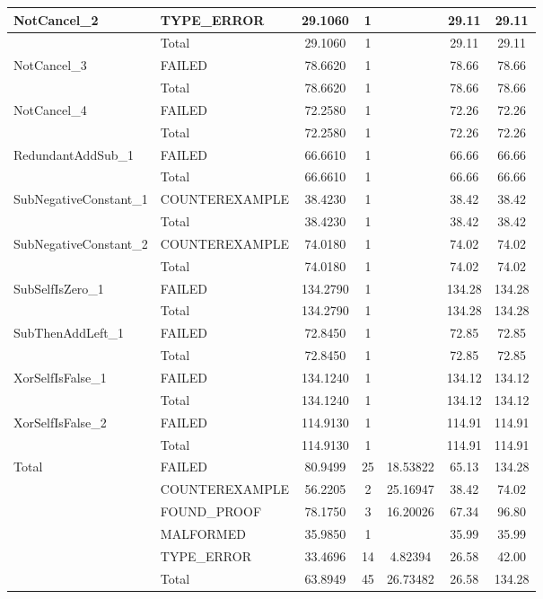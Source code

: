 \begin{appendices}
\begin{longtable}{L{0.25\textwidth} L{0.2\textwidth}  c  c  c  c  c }
    NotCancel\_2 & TYPE\_ERROR & 29.1060 & 1 &  & 29.11 & 29.11 \\ \midrule 
    & Total & 29.1060 & 1 &  & 29.11 & 29.11 \\ \midrule 
    NotCancel\_3 & FAILED & 78.6620 & 1 &  & 78.66 & 78.66 \\ \midrule 
    & Total & 78.6620 & 1 &  & 78.66 & 78.66 \\ \midrule 
    NotCancel\_4 & FAILED & 72.2580 & 1 &  & 72.26 & 72.26 \\ \midrule 
    & Total & 72.2580 & 1 &  & 72.26 & 72.26 \\ \midrule 
    RedundantAddSub\_1 & FAILED & 66.6610 & 1 &  & 66.66 & 66.66 \\ \midrule 
    & Total & 66.6610 & 1 &  & 66.66 & 66.66 \\ \midrule 
    SubNegativeConstant\_1 & COUNTEREXAMPLE & 38.4230 & 1 &  & 38.42 & 38.42 \\ \midrule 
    & Total & 38.4230 & 1 &  & 38.42 & 38.42 \\ \midrule 
    SubNegativeConstant\_2 & COUNTEREXAMPLE & 74.0180 & 1 &  & 74.02 & 74.02 \\ \midrule 
    & Total & 74.0180 & 1 &  & 74.02 & 74.02 \\ \midrule 
    SubSelfIsZero\_1 & FAILED & 134.2790 & 1 &  & 134.28 & 134.28 \\ \midrule 
    & Total & 134.2790 & 1 &  & 134.28 & 134.28 \\ \midrule 
    SubThenAddLeft\_1 & FAILED & 72.8450 & 1 &  & 72.85 & 72.85 \\ \midrule 
    & Total & 72.8450 & 1 &  & 72.85 & 72.85 \\ \midrule 
    XorSelfIsFalse\_1 & FAILED & 134.1240 & 1 &  & 134.12 & 134.12 \\ \midrule 
    & Total & 134.1240 & 1 &  & 134.12 & 134.12 \\ \midrule 
    XorSelfIsFalse\_2 & FAILED & 114.9130 & 1 &  & 114.91 & 114.91 \\ \midrule 
    & Total & 114.9130 & 1 &  & 114.91 & 114.91 \\ \midrule 
    Total & FAILED & 80.9499 & 25 & 18.53822 & 65.13 & 134.28 \\ \midrule 
    & COUNTEREXAMPLE & 56.2205 & 2 & 25.16947 & 38.42 & 74.02 \\ \midrule 
    & FOUND\_PROOF & 78.1750 & 3 & 16.20026 & 67.34 & 96.80 \\ \midrule 
    & MALFORMED & 35.9850 & 1 &  & 35.99 & 35.99 \\ \midrule 
    & TYPE\_ERROR & 33.4696 & 14 & 4.82394 & 26.58 & 42.00 \\ \midrule 
    & Total & 63.8949 & 45 & 26.73482 & 26.58 & 134.28 \\ \bottomrule 


\end{longtable}
\end{appendices}
